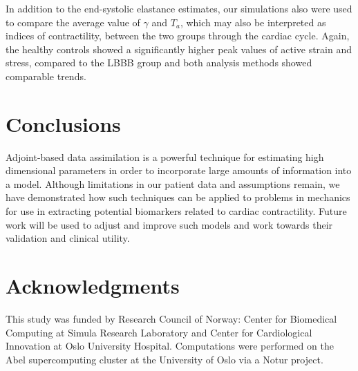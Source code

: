 In addition to the end-systolic elastance estimates, our simulations also were used to
compare the average value of $\gamma$ and $T_a$, which may also be
interpreted as indices of contractility, between the two groups
through the cardiac cycle. Again, the healthy controls showed a
significantly higher peak values of active strain and stress, compared
to the LBBB group and both  analysis methods showed comparable trends. 


\section{Conclusions}

Adjoint-based data assimilation is a powerful technique for
estimating high dimensional parameters in order to incorporate large
amounts of information into a model. Although limitations in our
patient data and assumptions remain, we have demonstrated how such
techniques can be applied to problems in mechanics for use in
extracting potential biomarkers related to cardiac
contractility. Future work will be used to adjust and improve such
models and work towards their validation and clinical utility.


\section*{Acknowledgments}
This study was funded by Research Council of Norway: Center for
Biomedical Computing at Simula Research Laboratory and Center for
Cardiological Innovation at Oslo University Hospital.
Computations were performed on the Abel supercomputing cluster at the 
University of Oslo via a Notur project.

\newpage



